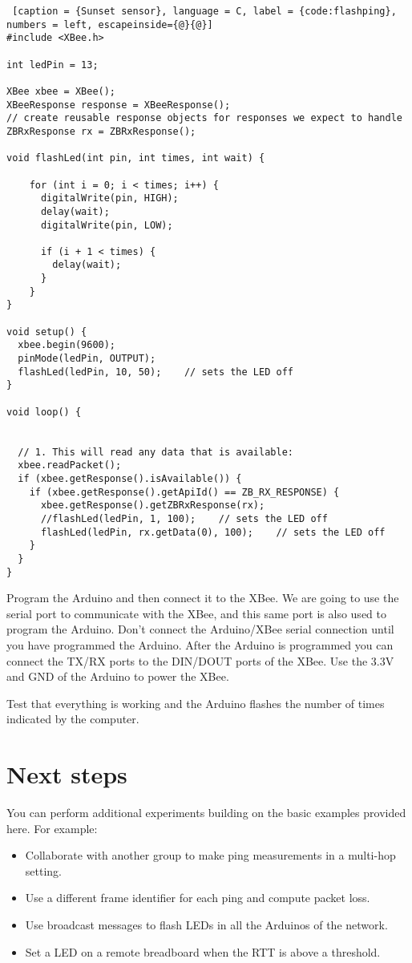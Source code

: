 \begin{lstlisting} [caption = {Sunset sensor}, language = C, label = {code:flashping}, numbers = left, escapeinside={@}{@}]
#include <XBee.h>

int ledPin = 13;

XBee xbee = XBee();
XBeeResponse response = XBeeResponse();
// create reusable response objects for responses we expect to handle 
ZBRxResponse rx = ZBRxResponse();

void flashLed(int pin, int times, int wait) {

    for (int i = 0; i < times; i++) {
      digitalWrite(pin, HIGH);
      delay(wait);
      digitalWrite(pin, LOW);

      if (i + 1 < times) {
        delay(wait);
      }
    }
}

void setup() {
  xbee.begin(9600);
  pinMode(ledPin, OUTPUT);
  flashLed(ledPin, 10, 50);    // sets the LED off
}

void loop() {


  // 1. This will read any data that is available:
  xbee.readPacket();
  if (xbee.getResponse().isAvailable()) {
    if (xbee.getResponse().getApiId() == ZB_RX_RESPONSE) {
      xbee.getResponse().getZBRxResponse(rx);
      //flashLed(ledPin, 1, 100);    // sets the LED off
      flashLed(ledPin, rx.getData(0), 100);    // sets the LED off
    }
  }
}
\end{lstlisting}

Program the Arduino and then connect it to the XBee. 
We are going to use the serial port to communicate with the XBee, and this same port is also used to program the Arduino.
Don't connect the Arduino/XBee serial connection until you have programmed the Arduino.
After the Arduino is programmed you can connect the TX/RX ports to the DIN/DOUT ports of the XBee.
Use the 3.3V and GND of the Arduino to power the XBee.

Test that everything is working and the Arduino flashes the number of times indicated by the computer.

\section{Next steps}

You can perform additional experiments  building on the basic examples provided here.
For example:
\begin{itemize}
\item Collaborate with another group to make ping measurements in a multi-hop setting.
\item Use a different frame identifier for each ping and compute packet loss.
\item Use broadcast messages to flash LEDs in all the Arduinos of the network.
\item Set a LED on a remote breadboard when the RTT is above a threshold.
\end{itemize}
